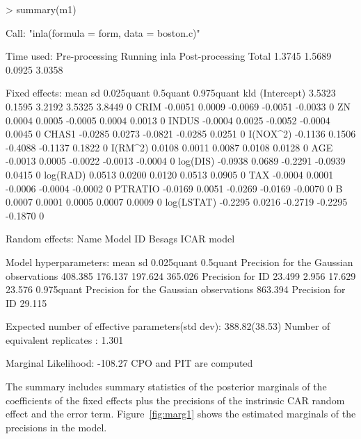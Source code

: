 \documentclass[article]{jss}
\begin{document}
\begin{Schunk}
\begin{Sinput}
> summary(m1)
\end{Sinput}
\begin{Soutput}
Call:
"inla(formula = form, data = boston.c)"

Time used:
 Pre-processing    Running inla Post-processing           Total 
         1.3745          1.5689          0.0925          3.0358 

Fixed effects:
               mean     sd 0.025quant 0.5quant 0.975quant kld
(Intercept)  3.5323 0.1595     3.2192   3.5325     3.8449   0
CRIM        -0.0051 0.0009    -0.0069  -0.0051    -0.0033   0
ZN           0.0004 0.0005    -0.0005   0.0004     0.0013   0
INDUS       -0.0004 0.0025    -0.0052  -0.0004     0.0045   0
CHAS1       -0.0285 0.0273    -0.0821  -0.0285     0.0251   0
I(NOX^2)    -0.1136 0.1506    -0.4088  -0.1137     0.1822   0
I(RM^2)      0.0108 0.0011     0.0087   0.0108     0.0128   0
AGE         -0.0013 0.0005    -0.0022  -0.0013    -0.0004   0
log(DIS)    -0.0938 0.0689    -0.2291  -0.0939     0.0415   0
log(RAD)     0.0513 0.0200     0.0120   0.0513     0.0905   0
TAX         -0.0004 0.0001    -0.0006  -0.0004    -0.0002   0
PTRATIO     -0.0169 0.0051    -0.0269  -0.0169    -0.0070   0
B            0.0007 0.0001     0.0005   0.0007     0.0009   0
log(LSTAT)  -0.2295 0.0216    -0.2719  -0.2295    -0.1870   0

Random effects:
Name	  Model
 ID   Besags ICAR model 

Model hyperparameters:
                                        mean    sd      0.025quant 0.5quant
Precision for the Gaussian observations 408.385 176.137 197.624    365.026 
Precision for ID                         23.499   2.956  17.629     23.576 
                                        0.975quant
Precision for the Gaussian observations 863.394   
Precision for ID                         29.115   

Expected number of effective parameters(std dev): 388.82(38.53)
Number of equivalent replicates : 1.301 

Marginal Likelihood:  -108.27 
CPO and PIT are computed
\end{Soutput}
\end{Schunk}
\noindent
The summary includes summary statistics of the posterior marginals of the
coefficients of the fixed effects plus the precisions of the instrinsic CAR
random effect and the error term. Figure~\ref{fig:marg1} shows the estimated
marginals of the precisions in the model.
\end{document}
